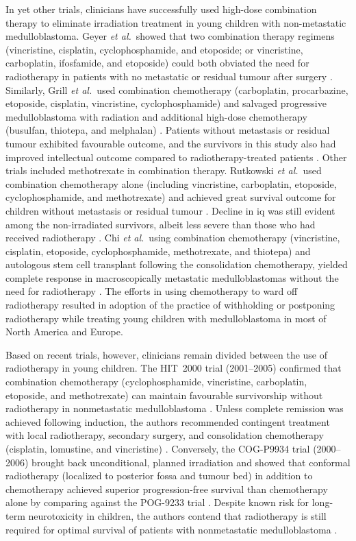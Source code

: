 In yet other trials, clinicians have successfully used high-dose combination therapy to eliminate irradiation treatment in young children with non-metastatic medulloblastoma. Geyer \emph{et al.}\ showed that two combination therapy regimens (vincristine, cisplatin, cyclophosphamide, and etoposide; or vincristine, carboplatin, ifosfamide, and etoposide) could both obviated the need for radiotherapy in patients with no metastatic or residual tumour after surgery .  Similarly, Grill \emph{et al.}\ used combination chemotherapy (carboplatin, procarbazine, etoposide, cisplatin, vincristine, cyclophosphamide) and salvaged progressive medulloblastoma with radiation and additional high-dose chemotherapy (busulfan, thiotepa, and melphalan) . Patients without metastasis or residual tumour exhibited favourable outcome, and the survivors in this study also had improved intellectual outcome compared to radiotherapy-treated patients . Other trials included methotrexate in combination therapy. Rutkowski \emph{et al.}\ used combination chemotherapy alone (including vincristine, carboplatin, etoposide, cyclophosphamide, and methotrexate) and achieved great survival outcome for children without metastasis or residual tumour . Decline in \gls{iq} was still evident among the non-irradiated survivors, albeit less severe than those who had received radiotherapy . Chi \emph{et al.}\ using combination chemotherapy (vincristine, cisplatin, etoposide, cyclophosphamide, methotrexate, and thiotepa) and autologous stem cell transplant following the consolidation chemotherapy, yielded complete response in macroscopically metastatic medulloblastomas without the need for radiotherapy . The efforts in using chemotherapy to ward off radiotherapy resulted in adoption of the practice of withholding or postponing radiotherapy while treating young children with medulloblastoma in most of North America and Europe.

Based on recent trials, however, clinicians remain divided between the use of radiotherapy in young children. The HIT~2000 trial (2001--2005) confirmed that combination chemotherapy (cyclophosphamide, vincristine, carboplatin, etoposide, and methotrexate) can maintain favourable survivorship without radiotherapy in nonmetastatic medulloblastoma . Unless complete remission was achieved following induction, the authors recommended contingent treatment with local radiotherapy, secondary surgery, and consolidation chemotherapy (cisplatin, lomustine, and vincristine) . Conversely, the COG-P9934 trial (2000--2006) brought back unconditional, planned irradiation and showed that conformal radiotherapy (localized to posterior fossa and tumour bed) in addition to chemotherapy achieved superior progression-free survival than chemotherapy alone by comparing against the POG-9233 trial . Despite known risk for long-term neurotoxicity in children, the authors contend that radiotherapy is still required for optimal survival of patients with nonmetastatic medulloblastoma .

